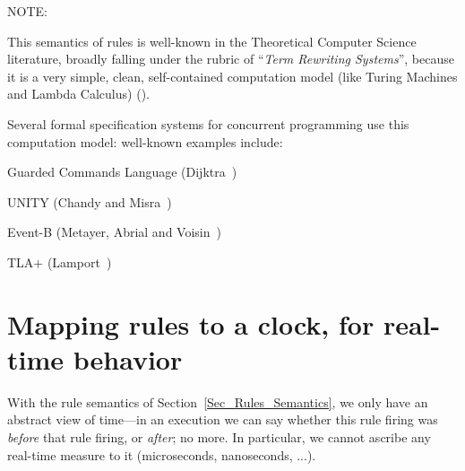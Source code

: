 \vspace{2ex}

NOTE: 

\vspace{2ex}

This semantics of rules is well-known in the Theoretical Computer
Science literature, broadly falling under the rubric of ``\emph{Term
Rewriting Systems}'', because it is a very simple, clean,
self-contained computation model (like Turing Machines and Lambda
Calculus) (\cite{Baader98a,Kamperman1996a,Klop1992a,Terese2003}).

Several formal specification systems for concurrent programming use
this computation model: well-known examples include:
\begin{tightlist}
 \item Guarded Commands Language (Dijktra~\cite{Dijkstra1976})
 \item UNITY (Chandy and Misra~\cite{Chandy1988a})
 \item Event-B (Metayer, Abrial and Voisin~\cite{Metayer2005a})
 \item TLA+ (Lamport~\cite{Lamport2002a})
\end{tightlist}


\section{Mapping rules to a clock, for real-time behavior}

\label{Sec_Mapping_Rules_to_a_Clock}

With the rule semantics of Section~\ref{Sec_Rules_Semantics}, we only
have an abstract view of time---in an execution we can say whether
this rule firing was \emph{before} that rule firing, or \emph{after};
no more. In particular, we cannot ascribe any real-time measure to it
(microseconds, nanoseconds, ...).

